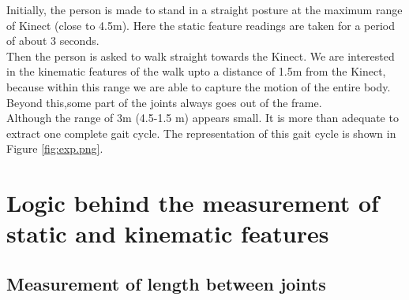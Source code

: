 \noindent Initially, the person is made to stand in a straight posture at the maximum range of Kinect (close to 4.5m). Here the static feature readings are taken for a period of about 3 seconds.\\

\noindent Then the person is asked to walk straight towards the Kinect. We are interested in the kinematic features of the walk upto a distance of 1.5m from the Kinect, because within this range we are able to capture the motion of the entire body. Beyond this,some part of the joints always goes out of the frame.\\

\noindent Although the range of 3m (4.5-1.5 m) appears small. It is more than adequate to extract one complete gait cycle. The representation of this gait cycle is shown in Figure \ref{fig:exp.png}.\\

\newpage

\section{Logic behind the measurement of static and kinematic features}\label{Logic behind the measurement of static and kinematic features} 
\subsection{Measurement of length between joints}\label{Measurement of length between joints} 

